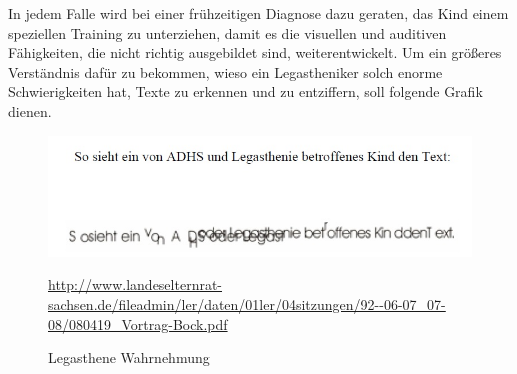  In jedem Falle wird bei einer frühzeitigen Diagnose dazu geraten, das Kind einem speziellen Training zu unterziehen, damit es die visuellen und auditiven Fähigkeiten, die nicht richtig ausgebildet sind, weiterentwickelt. Um ein größeres Verständnis dafür zu bekommen, wieso ein Legastheniker solch enorme Schwierigkeiten hat, Texte zu erkennen und zu entziffern, soll folgende Grafik dienen.\\

\begin{figure}[h]
	\centering
		\includegraphics[width=1.00\textwidth]{Daten/legastheneWahrnehmung.jpg}
	\caption{Legasthene Wahrnehmung}
	\url{http://www.landeselternrat-sachsen.de/fileadmin/ler/daten/01ler/04sitzungen/92--06-07_07-08/080419_Vortrag-Bock.pdf}
	\label{fig:legastheneWahrnehmung}
\end{figure}